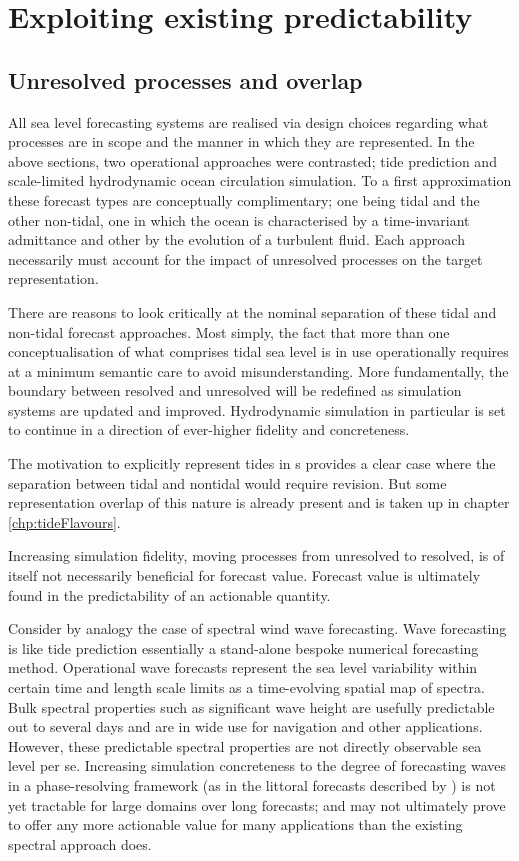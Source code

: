 \section{Exploiting existing predictability}
\label{sec:exploitingPredictability}
\subsection{Unresolved processes and overlap}
All sea level forecasting systems are realised via design choices regarding what processes are in scope and the manner in which they are represented.
In the above sections, two operational approaches were contrasted; tide prediction and scale-limited hydrodynamic ocean circulation simulation.
To a first approximation these forecast types are conceptually complimentary; one being tidal and the other non-tidal, one in which the ocean is characterised by a time-invariant admittance and other by the evolution of a turbulent fluid. 
Each approach necessarily must account for the impact of unresolved processes on the target representation.


There are reasons to look critically at the nominal separation of these tidal and non-tidal forecast approaches.
Most simply, the fact that more than one conceptualisation of what comprises tidal sea level is in use operationally requires at a minimum semantic care to avoid misunderstanding.
More fundamentally, the boundary between resolved and unresolved will be redefined as simulation systems are updated and improved.  Hydrodynamic simulation in particular is set to continue in a direction of ever-higher fidelity and concreteness.

The motivation to explicitly represent tides in \OGCM{}s provides a clear case where the separation between tidal and nontidal would require revision.   
But some representation overlap of this nature is already present and is taken up in chapter \ref{chp:tideFlavours}.


Increasing simulation fidelity, moving processes from unresolved to resolved, is of itself not necessarily beneficial for forecast value.
Forecast value is ultimately found in the predictability of an actionable quantity.  


Consider by analogy the case of spectral wind wave forecasting. 
Wave forecasting is like tide prediction essentially a stand-alone bespoke numerical forecasting method.   Operational wave forecasts represent the sea level variability within certain time and length scale limits as a time-evolving spatial map of spectra. Bulk spectral properties such as significant wave height are usefully predictable out to several days and are in wide use for navigation and other applications.   However, these predictable spectral properties are not directly observable sea level per se.   Increasing simulation concreteness to the degree of forecasting waves in a phase-resolving framework (as in the littoral forecasts described by \cite{10.1080/1755876x.2019.1685834}) is not yet tractable for large domains over long forecasts; and may not ultimately prove to offer any more actionable value for many applications than the existing spectral approach does.



